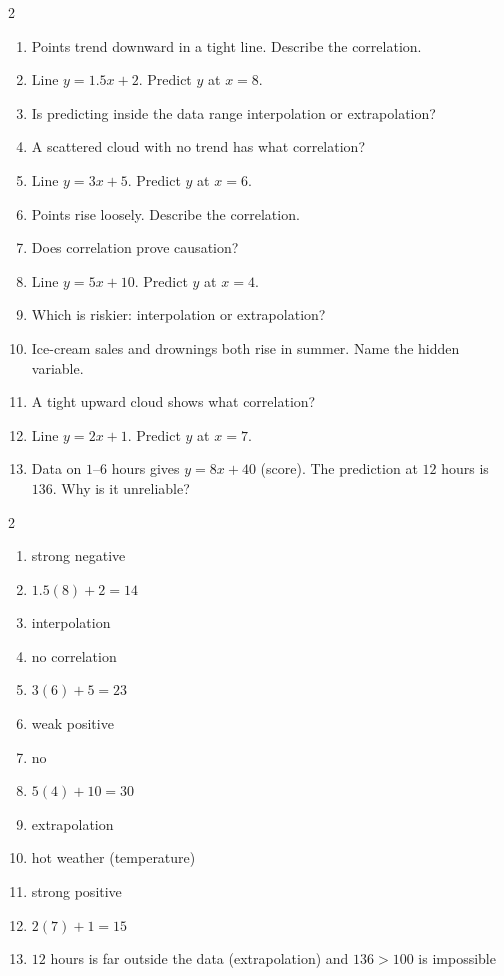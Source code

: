 \documentclass[11pt]{article}
\begin{document}
\begin{recapbox}
\begin{multicols}{2}
\small
\begin{enumerate}[leftmargin=*,itemsep=3pt]
  \item Points trend downward in a tight line. Describe the correlation.
  \item Line $y=1.5x+2$. Predict $y$ at $x=8$.
  \item Is predicting inside the data range interpolation or extrapolation?
  \item A scattered cloud with no trend has what correlation?
  \item Line $y=3x+5$. Predict $y$ at $x=6$.
  \item Points rise loosely. Describe the correlation.
  \item Does correlation prove causation?
  \item Line $y=5x+10$. Predict $y$ at $x=4$.
  \item Which is riskier: interpolation or extrapolation?
  \item Ice-cream sales and drownings both rise in summer. Name the hidden variable.
  \item A tight upward cloud shows what correlation?
  \item Line $y=2x+1$. Predict $y$ at $x=7$.
  \item Data on $1$–$6$ hours gives $y=8x+40$ (score). The prediction at $12$ hours is $136$. Why is it unreliable?
\end{enumerate}
\end{multicols}
\end{recapbox}

\begin{keybox}
\begin{multicols}{2}
\small
\begin{enumerate}[leftmargin=*,itemsep=3pt]
  \item strong negative
  \item $1.5(8)+2=14$
  \item interpolation
  \item no correlation
  \item $3(6)+5=23$
  \item weak positive
  \item no
  \item $5(4)+10=30$
  \item extrapolation
  \item hot weather (temperature)
  \item strong positive
  \item $2(7)+1=15$
  \item $12$ hours is far outside the data (extrapolation) and $136>100$ is impossible
\end{enumerate}
\end{multicols}
\end{keybox}
\end{document}
